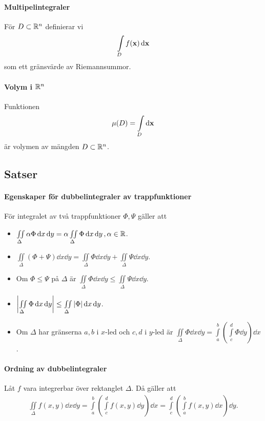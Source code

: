 \paragraph{Multipelintegraler}
För $D\subset\mathbb{R}^n$ definierar vi
\begin{align*}
	\int\limits_{D}f(\vect{x})\dd{\vect{x}}
\end{align*}
som ett gränsvärde av Riemannsummor.

\paragraph{Volym i $\mathbb{R}^n$}
Funktionen
\begin{align*}
	\mu (D) = \int\limits_{D}\dd{\vect{x}}
\end{align*}
är volymen av mängden $D\subset\mathbb{R}^n$.

\subsection{Satser}

\paragraph{Egenskaper för dubbelintegraler av trappfunktioner}
För integralet av två trappfunktioner $\Phi, \Psi$ gäller att
\begin{itemize}
	\item $\iint\limits_{\Delta}\alpha\Phi\dd{x}\dd{y} = \alpha\iint\limits_{\Delta}\Phi\dd{x}\dd{y}, \alpha\in\mathbb{R}$.
	\item $\iint\limits_{\Delta}(\Phi + \Psi)\dd{x}\dd{y} = \iint\limits_{\Delta}\Phi\dd{x}\dd{y} + \iint\limits_{\Delta}\Psi\dd{x}\dd{y}$.
	\item Om $\Phi\leq\Psi$ på $\Delta$ är $\iint\limits_{\Delta}\Phi\dd{x}\dd{y}\leq\iint\limits_{\Delta}\Psi\dd{x}\dd{y}$.
	\item $\abs{\iint\limits_{\Delta}\Phi\dd{x}\dd{y}}\leq\iint\limits_{\Delta}\abs{\Phi}\dd{x}\dd{y}$.
	\item Om $\Delta$ har gränserna $a, b$ i $x$-led och $c, d$ i $y$-led är $\iint\limits_{\Delta}\Phi\dd{x}\dd{y} = \int\limits_{a}^{b}\left(\int\limits_{c}^{d}\Phi\dd{y}\right)\dd{x}$.
\end{itemize}

\proof

\paragraph{Ordning av dubbelintegraler}
Låt $f$ vara integrerbar över rektanglet $\Delta$. Då gäller att
\begin{align*}
	\iint\limits_{\Delta}f(x, y)\dd{x}\dd{y} = \int\limits_{a}^{b}\left(\int\limits_{c}^{d}f(x, y)\dd{y}\right)\dd{x} = \int\limits_{c}^{d}\left(\int\limits_{a}^{b}f(x, y)\dd{x}\right)\dd{y}.
\end{align*}

